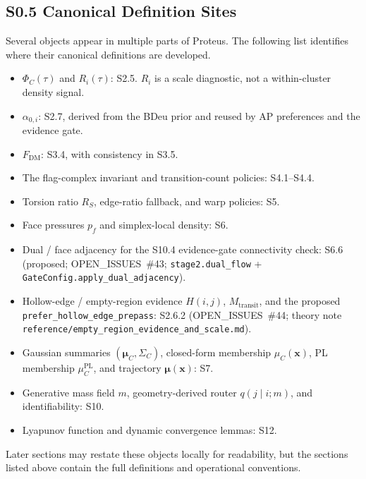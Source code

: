 \documentclass[11pt]{article}
\begin{document}
\subsection*{S0.5 Canonical Definition Sites}
Several objects appear in multiple parts of Proteus. The following list identifies where their canonical definitions are developed.
\begin{itemize}[leftmargin=1.5em]
  \item $\Phi_C(\tau)$ and $R_i(\tau)$: S2.5. $R_i$ is a scale diagnostic, not a within-cluster density signal.
  \item $\alpha_{0,i}$: S2.7, derived from the BDeu prior and reused by AP preferences and the evidence gate.
  \item $F_{\mathrm{DM}}$: S3.4, with consistency in S3.5.
  \item The flag-complex invariant and transition-count policies: S4.1--S4.4.
  \item Torsion ratio $R_S$, edge-ratio fallback, and warp policies: S5.
  \item Face pressures $p_f$ and simplex-local density: S6.
  \item Dual / face adjacency for the S10.4 evidence-gate connectivity check: S6.6 (proposed; OPEN\_ISSUES~\#43; \texttt{stage2.dual\_flow} + \texttt{GateConfig.apply\_dual\_adjacency}).
  \item Hollow-edge / empty-region evidence $H(i,j)$, $M_{\mathrm{transit}}$, and the proposed \texttt{prefer\_hollow\_edge\_prepass}: S2.6.2 (OPEN\_ISSUES~\#44; theory note \texttt{reference/empty\_region\_evidence\_and\_scale.md}).
  \item Gaussian summaries $(\boldsymbol\mu_C,\Sigma_C)$, closed-form membership $\mu_C(\mathbf x)$, PL membership $\mu_C^{\mathrm{PL}}$, and trajectory $\boldsymbol\mu(\mathbf x)$: S7.
  \item Generative mass field $m$, geometry-derived router $q(j\mid i;m)$, and identifiability: S10.
  \item Lyapunov function and dynamic convergence lemmas: S12.
\end{itemize}
Later sections may restate these objects locally for readability, but the sections listed above contain the full definitions and operational conventions.
\end{document}
